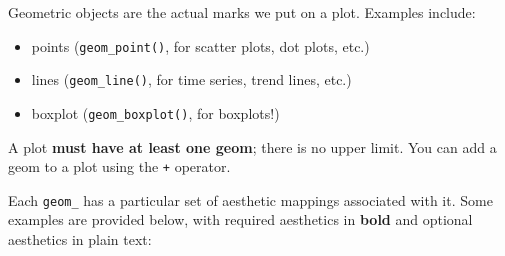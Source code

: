\documentclass[
]{book}
\providecommand{\tightlist}{%
  \setlength{\itemsep}{0pt}\setlength{\parskip}{0pt}}
\begin{document}
Geometric objects are the actual marks we put on a plot. Examples include:

\begin{itemize}
\tightlist
\item
  points (\texttt{geom\_point()}, for scatter plots, dot plots, etc.)
\item
  lines (\texttt{geom\_line()}, for time series, trend lines, etc.)
\item
  boxplot (\texttt{geom\_boxplot()}, for boxplots!)
\end{itemize}

A plot \textbf{must have at least one geom}; there is no upper limit. You can add a geom to a plot using the \texttt{+} operator.

Each \texttt{geom\_} has a particular set of aesthetic mappings associated with it. Some examples are provided below, with required aesthetics in \textbf{bold} and optional aesthetics in plain text:
\end{document}
